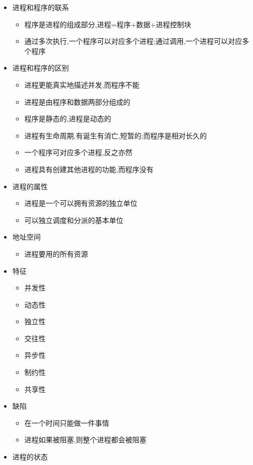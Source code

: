 \documentclass[a4paper,12pt,notitlepage]{article}
\begin{document}
\begin{itemize}
	\item 进程和程序的联系
	\begin{itemize}
		\item 程序是进程的组成部分,进程=程序+数据+进程控制块
		\item 通过多次执行,一个程序可以对应多个进程;通过调用,一个进程可以对应多个程序
	\end{itemize}
	\item 进程和程序的区别
	\begin{itemize}
		\item 进程更能真实地描述并发,而程序不能
		\item 进程是由程序和数据两部分组成的
		\item 程序是静态的,进程是动态的
		\item 进程有生命周期,有诞生有消亡,短暂的;而程序是相对长久的
		\item 一个程序可对应多个进程,反之亦然
		\item 进程具有创建其他进程的功能,而程序没有
	\end{itemize}
	\item 进程的属性
	\begin{itemize}
		\item 进程是一个可以拥有资源的独立单位
		\item 可以独立调度和分派的基本单位
	\end{itemize}
	\item 地址空间
	\begin{itemize}
		\item 进程要用的所有资源
	\end{itemize}
	\item 特征
	\begin{itemize}
		\item 并发性
		\item 动态性
		\item 独立性
		\item 交往性
		\item 异步性
		\item 制约性
		\item 共享性
	\end{itemize}
	\item 缺陷
	\begin{itemize}
		\item 在一个时间只能做一件事情
		\item 进程如果被阻塞,则整个进程都会被阻塞
	\end{itemize}
	\item 进程的状态
	\begin{itemize}

\end{itemize}
\end{itemize}
\end{document}
